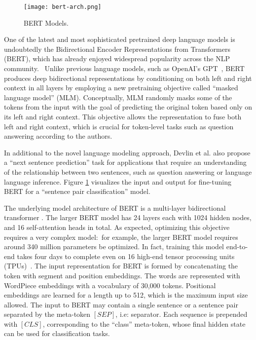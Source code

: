 \begin{figure}[b!]
\centering
  \texttt{[image: bert-arch.png]}
\caption{BERT Models.}
\label{fig:bert}
\end{figure}

One of the latest and most sophisticated pretrained deep language models is undoubtedly the Bidirectional Encoder Representations from Transformers (BERT), which has already enjoyed widespread popularity across the NLP community.~\cite{devlin2018bert}
Unlike previous language models, such as OpenAI's GPT~\cite{radford2019language}, BERT produces deep bidirectional representations by conditioning on both left and right context in all layers by employing a new pretraining objective called ``masked language model'' (MLM).
Conceptually, MLM randomly masks some of the tokens from the input with the goal of predicting the original token based only on its left and right context.
This objective allows the representation to fuse both left and right context, which is crucial for token-level tasks such as question answering according to the authors.


In additional to the novel language modeling approach, Devlin et al. \cite{devlin2018bert} also propose a ``next sentence prediction'' task for applications that require an understanding of the relationship between two sentences, such as question answering or language language inference.
Figure \ref{fig:bert} visualizes the input and output for fine-tuning BERT for a ``sentence pair classification'' model.

The underlying model architecture of BERT is a multi-layer bidirectional transformer \cite{vaswani2017attention}.
The larger BERT model has 24 layers each with 1024 hidden nodes, and 16 self-attention heads in total.
As expected, optimizing this objective requires a very complex model:\ for example, the larger BERT model requires around 340 million parameters be optimized.
In fact, training this model end-to-end takes four days to complete even on 16 high-end tensor processing units (TPUs)~\cite{devlin2018bert}.
The input representation for BERT is formed by concatenating the token with segment and position embeddings.
The words are represented with WordPiece embeddings \cite{} with a vocabulary of 30,000 tokens.
Positional embeddings are learned for a length up to 512, which is the maximum input size allowed.
The input to BERT may contain a single sentence or a sentence pair separated by the meta-token $[SEP]$, i.e: separator.
Each sequence is prepended with $[CLS]$, corresponding to the ``class'' meta-token, whose final hidden state can be used for classification tasks.

